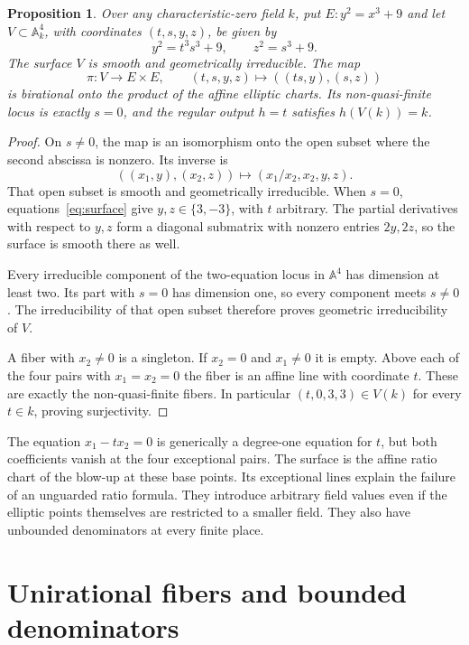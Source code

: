 \documentclass[11pt,a4paper]{article}
\newtheorem{proposition}[theorem]{Proposition}
\theoremstyle{definition}
\newcommand{\A}{\mathbb A}\newcommand{\PP}{\mathbb P}
\begin{document}
\begin{proposition}\label{prop:sharp}
Over any characteristic-zero field $k$, put $E:y^2=x^3+9$ and
let $V\subset\A^4_k$, with coordinates $(t,s,y,z)$, be given by
\begin{equation}\label{eq:surface}
                   y^2=t^3s^3+9,\qquad z^2=s^3+9.
\end{equation}
The surface $V$ is smooth and geometrically irreducible. The map
\[
       \pi:V\longrightarrow E\times E,\qquad
       (t,s,y,z)\longmapsto((ts,y),(s,z))
\]
is birational onto the product of the affine elliptic charts.
Its non-quasi-finite locus is exactly $s=0$, and the regular output
$h=t$ satisfies $h(V(k))=k$.
\end{proposition}
\begin{proof}
On $s\ne0$, the map is an isomorphism onto the open subset where
the second abscissa is nonzero. Its inverse is
\[
             ((x_1,y),(x_2,z))\longmapsto(x_1/x_2,x_2,y,z).
\]
That open subset is smooth and geometrically irreducible. When
$s=0$, equations~\eqref{eq:surface} give $y,z\in\{3,-3\}$,
with $t$ arbitrary. The partial derivatives with respect to $y,z$
form a diagonal submatrix with nonzero entries $2y,2z$, so the
surface is smooth there as well.

Every irreducible component of the two-equation locus in $\A^4$
has dimension at least two. Its part with $s=0$ has dimension one,
so every component meets $s\ne0$. The irreducibility of that open
subset therefore proves geometric irreducibility of $V$.

A fiber with $x_2\ne0$ is a singleton. If $x_2=0$ and $x_1\ne0$
it is empty. Above each of the four pairs with $x_1=x_2=0$ the
fiber is an affine line with coordinate $t$. These are exactly the
non-quasi-finite fibers. In particular $(t,0,3,3)\in V(k)$ for
every $t\in k$, proving surjectivity.
\end{proof}

The equation $x_1-tx_2=0$ is generically a degree-one equation for
$t$, but both coefficients vanish at the four exceptional pairs.
The surface is the affine ratio chart of the blow-up at these
base points. Its exceptional lines explain the failure of an
unguarded ratio formula. They introduce arbitrary field values
even if the elliptic points themselves are restricted to a smaller
field. They also have unbounded denominators at every finite place.

\section{Unirational fibers and bounded denominators}
\end{document}
